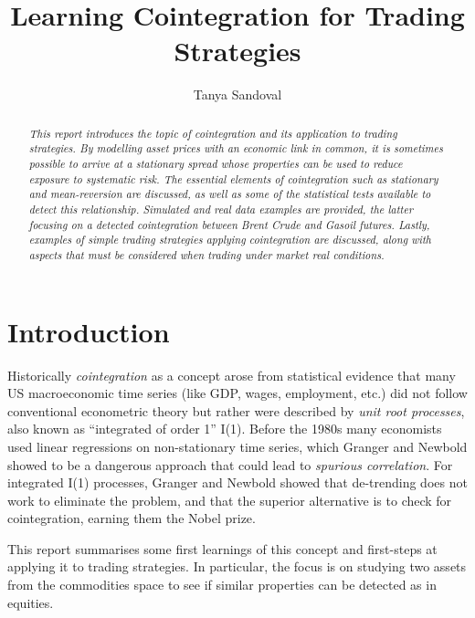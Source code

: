 \documentclass[11pt]{article}
\title{Learning Cointegration for Trading Strategies}
\author{Tanya Sandoval}
\begin{document}
    \maketitle

    \begin{abstract}
    \emph{This report introduces the topic of cointegration  and its application to trading strategies. 
    By modelling asset prices with an economic  link in common, it is sometimes possible to arrive at a stationary spread whose properties can be used to reduce exposure to systematic risk. The essential elements of cointegration such as stationary and mean-reversion are discussed, as well as some of the statistical tests available to detect this relationship. Simulated  and real data examples are provided, the latter focusing on a detected cointegration  between  Brent Crude and Gasoil futures. Lastly, examples of simple trading strategies applying cointegration are discussed, along with aspects that must be considered when trading under market real conditions. }
    \end{abstract}

    \newpage

    \tableofcontents
    
           \afterpage{\null\newpage}
   
    
    \newpage


    \section{Introduction}\label{introduction}
    
    Historically  {\em cointegration} as a concept arose from statistical evidence that many US macroeconomic time series (like GDP, wages, employment, etc.) did not follow conventional econometric theory but rather were described by {\em unit root processes}, also known as  ``integrated of order 1'' I(1). Before the 1980s many economists used linear regressions on non-stationary time series, which Granger and Newbold showed to be a dangerous approach that could lead to  {\em spurious correlation}. For integrated I(1) processes, Granger and Newbold showed that de-trending does not work to eliminate the problem, and that the superior alternative is to check for cointegration, earning them the Nobel prize. 
    
    This report summarises some first learnings of this concept and first-steps at applying it to trading strategies. In particular, the focus is on studying two assets from the commodities space to see if similar properties can be detected as in equities.
    
\end{document}
